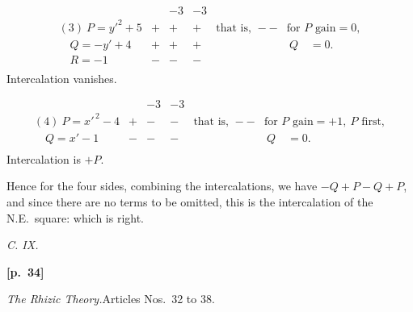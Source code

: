 \documentclass[11pt,a4paper]{article}
\begin{document}
\[
\begin{array}{l|ccc|cl}
 & & -3 & -3 & & \\\hline
(3)\ P=y'^{2}+5 & + & + & + & \text{that is, } -- & \text{for }P\text{ gain}=0, \\
\quad Q=-y'+4 & + & + & + & & \ Q\quad =0. \\
\quad R=-1 & - & - & - & & \\
\end{array}
\]
Intercalation vanishes.

\[
\begin{array}{l|ccc|cl}
 & & -3 & -3 & & \\\hline
(4)\ P=x'^{\,2}-4 & + & - & - & \text{that is, } -- & \text{for }P\text{ gain}=+1,\ P\text{ first}, \\
\quad Q=x'-1 & - & - & - & & \ Q\quad =0. \\
\end{array}
\]
Intercalation is $+P$.

Hence for the four sides, combining the intercalations, we have $-Q+P-Q+P$, and since there are no terms to be omitted, this is the intercalation of the N.E.\ square: which is right.

\bigskip

\begin{center}\textit{C. IX.}\end{center}

\bigskip

\noindent\textbf{[p.~34]}\quad

\begin{center}\textit{The Rhizic Theory.}\quad Articles Nos.~32 to 38.\end{center}

\medskip
\end{document}
